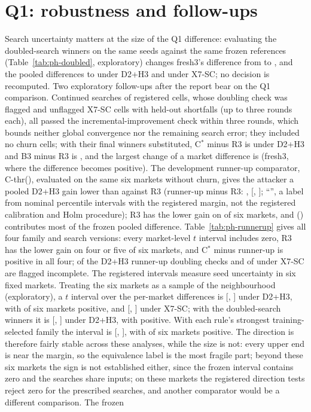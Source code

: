 \documentclass[11pt]{article}
\begin{document}
\FloatBarrier
\section{Q1: robustness and follow-ups}\label{sec:app-q1}
Search uncertainty matters at the size of the Q1 difference: evaluating the doubled-search winners on the same seeds against the same frozen references (Table~\ref{tab:ph-doubled}, exploratory) changes fresh3's difference from  to , and the pooled differences to  under D2+H3 and  under X7-SC; no decision is recomputed. Two exploratory follow-ups after the report bear on the Q1 comparison. Continued searches of  registered cells,  whose doubling check was flagged and  unflagged X7-SC cells with held-out shortfalls (up to three rounds each), all passed the incremental-improvement check within three rounds, which bounds neither global convergence nor the remaining search error; they included no churn cells; with their final winners substituted, C$^*$ minus R3 is  under D2+H3 and B3 minus R3 is , and the largest change of a market difference is  (fresh3, where the difference becomes positive). The development runner-up comparator, C-thr(), evaluated on the same six markets without churn, gives the attacker a pooled D2+H3 gain lower than against R3 (runner-up minus R3: , [, ]; ``'', a label from nominal percentile intervals with the registered margin, not the registered calibration and Holm procedure); R3 has the lower gain on  of six markets, and  () contributes most of the frozen pooled difference. Table~\ref{tab:ph-runnerup} gives all four family and search versions: every market-level $t$ interval includes zero, R3 has the lower gain on four or five of six markets, and C$^*$ minus runner-up is positive in all four;  of the  D2+H3 runner-up doubling checks and  of  under X7-SC are flagged incomplete. The registered intervals measure seed uncertainty in six fixed markets. Treating the six markets as a sample of the neighbourhood (exploratory), a $t$ interval over the per-market differences is [, ] under D2+H3, with  of six markets positive, and [, ] under X7-SC; with the doubled-search winners it is [, ] under D2+H3, with  positive. With each rule's strongest training-selected family the interval is [, ], with  of six markets positive. The direction is therefore fairly stable across these analyses, while the size is not: every upper end is near the margin, so the equivalence label is the most fragile part; beyond these six markets the sign is not established either, since the frozen interval contains zero and the searches share inputs; on these markets the registered direction tests reject zero for the prescribed searches, and another comparator would be a different comparison. The frozen 
\end{document}

